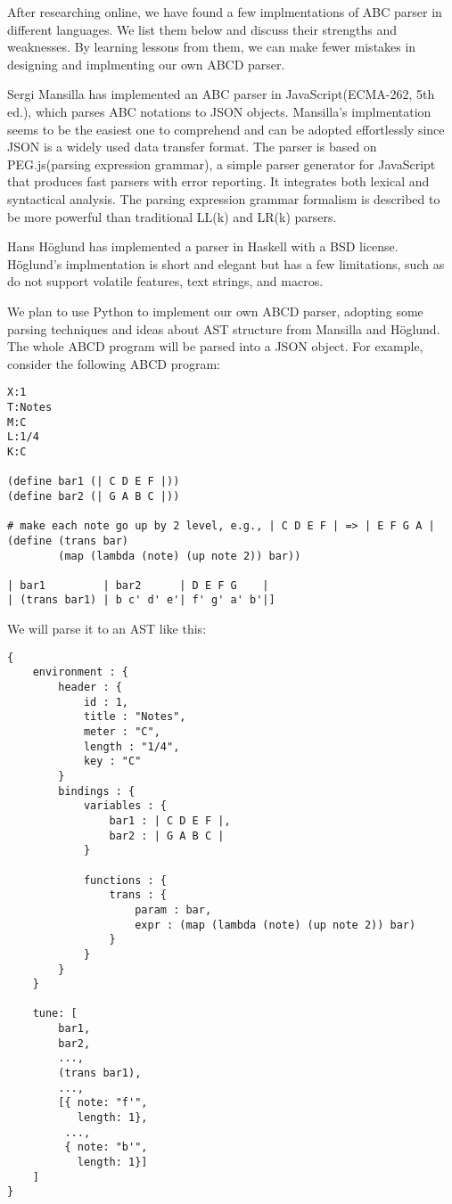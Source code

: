 After researching online, we have found a few implmentations of ABC parser in different languages. We list them below and discuss their strengths and weaknesses. By learning lessons from them, we can make fewer mistakes in designing and implmenting our own ABCD parser.

Sergi Mansilla has implemented an ABC parser in JavaScript(ECMA-262, 5th ed.), which parses ABC notations to JSON objects\cite{Mansilla12}. Mansilla's implmentation seems to be the easiest one to comprehend and can be adopted effortlessly since JSON is a widely used data transfer format. The parser is based on PEG.js(parsing expression grammar), a simple parser generator for JavaScript that produces fast parsers with error reporting\cite{Ryuu17}. It integrates both lexical and syntactical analysis. The parsing expression grammar formalism is described to be more powerful than traditional LL(k) and LR(k) parsers.

Hans H\"{o}glund has implemented a parser in Haskell\cite{Hoglund15} with a BSD license. H\"{o}glund's implmentation is short and elegant but has a few limitations, such as do not support volatile features, text strings, and macros.

We plan to use Python to implement our own ABCD parser, adopting some parsing techniques and ideas about AST structure from Mansilla and H\"{o}glund. The whole ABCD program will be parsed into a JSON object. For example, consider the following ABCD program:
\begin{verbatim}
X:1
T:Notes
M:C
L:1/4
K:C

(define bar1 (| C D E F |))
(define bar2 (| G A B C |))

# make each note go up by 2 level, e.g., | C D E F | => | E F G A |
(define (trans bar)
        (map (lambda (note) (up note 2)) bar))

| bar1         | bar2      | D E F G    |
| (trans bar1) | b c' d' e'| f' g' a' b'|]
\end{verbatim}

We will parse it to an AST like this:
\begin{verbatim}
{
    environment : {
        header : {
            id : 1,
            title : "Notes",
            meter : "C",
            length : "1/4",
            key : "C"
        }
        bindings : {
            variables : {
                bar1 : | C D E F |,
                bar2 : | G A B C |
            }

            functions : {
                trans : {
                    param : bar,
                    expr : (map (lambda (note) (up note 2)) bar)
                }
            }
        }
    }

    tune: [
        bar1,
        bar2,
        ...,
        (trans bar1),
        ...,
        [{ note: "f'",
           length: 1},
         ...,
         { note: "b'",
           length: 1}]
    ]
}
\end{verbatim}

